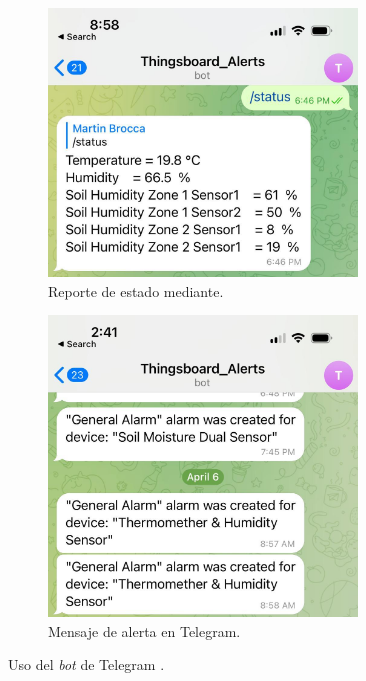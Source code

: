 \begin{figure}[!htpb]
     \centering
     \begin{subfigure}[b]{0.45\textwidth}
	    \centering
	    \includegraphics[width=0.9\textwidth]{./Figures/Telegram_Status.jpg}
	     \caption[Reporte de estado mediante]{Reporte de estado mediante.}
	     \label{fig:telegram_status}
     \end{subfigure}
     \hfill
     \begin{subfigure}[b]{0.45\textwidth}
	\centering
	    \includegraphics[width=0.9\textwidth]{./Figures/TB_Alert.jpg}
	     \caption[Mensaje de alerta en Telegram]{Mensaje de alerta en Telegram.}
	     \label{fig:telegram_alerts}
     \end{subfigure}	
	   \hfill
        \caption[Uso del \textit{bot} de Telegram ]{Uso del \textit{bot} de Telegram .}
        \label{fig:Telegram_bot}
\end{figure}





